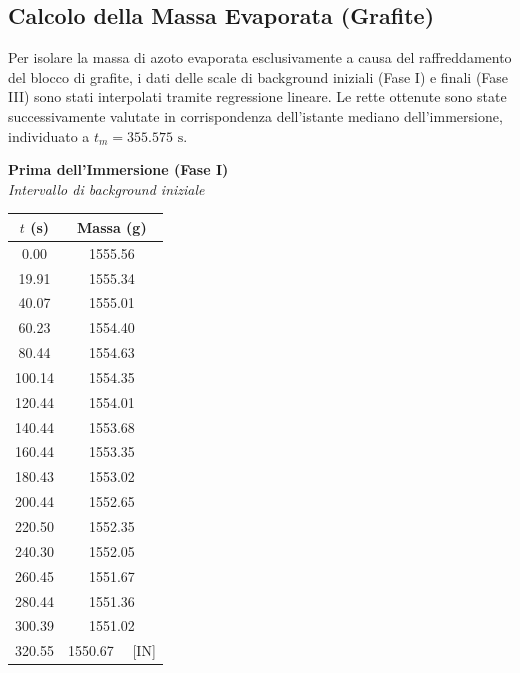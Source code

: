 \documentclass[a4paper,12pt]{article}
\begin{document}
\subsection{Calcolo della Massa Evaporata (Grafite)}
Per isolare la massa di azoto evaporata esclusivamente a causa del raffreddamento del blocco di grafite, i dati delle scale di background iniziali (Fase I) e finali (Fase III) sono stati interpolati tramite regressione lineare. Le rette ottenute sono state successivamente valutate in corrispondenza dell'istante mediano dell'immersione, individuato a $t_m = 355.575\text{ s}$.
\begin{table}[htbp]
    \centering
    \footnotesize
    \noindent
    \begin{minipage}[t]{0.38\textwidth}
        \centering
        \textbf{Prima dell'Immersione (Fase I)} \\
        \textit{Intervallo di background iniziale} \\
        \vspace{0.3cm}
        \begin{tabular}{cc}
            \hline
            $t$ (s) & Massa (g) \\ \hline
            0.00 & 1555.56 \\
            19.91 & 1555.34 \\
            40.07 & 1555.01 \\
            60.23 & 1554.40 \\
            80.44 & 1554.63 \\
            100.14 & 1554.35 \\
            120.44 & 1554.01 \\
            140.44 & 1553.68 \\
            160.44 & 1553.35 \\
            180.43 & 1553.02 \\
            200.44 & 1552.65 \\
            220.50 & 1552.35 \\
            240.30 & 1552.05 \\
            260.45 & 1551.67 \\
            280.44 & 1551.36 \\
            300.39 & 1551.02 \\
            320.55 & 1550.67 \ \ [IN] \\ \hline
        \end{tabular}
    \end{minipage}

\end{table}
\end{document}
